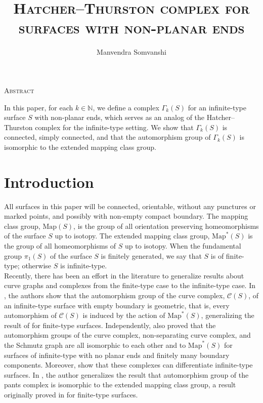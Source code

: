\documentclass[11pt]{article}
\title{\large\textsc{Hatcher--Thurston complex for surfaces with non-planar ends}}
\author{\normalsize Manvendra Somvanshi}
\date{}
\def\N{\mathbb{N}}
\def\map{\text{Map}}
\renewcommand{\abstractname}{\textmd{\textsc{Abstract}}}
\renewenvironment{abstract}
 {\small
  \begin{center}
  \abstractname\vspace{0pt}\vspace{0pt}
  \end{center}
  \quotation}
 {\endquotation}
\begin{document}
\maketitle
\begin{abstract}
In this paper, for each $k\in \N$, we define a complex $\Gamma_k(S)$ for an infinite-type surface $S$ with non-planar ends, which serves as an analog of the Hatcher--Thurston complex for the infinite-type setting. We show that $\Gamma_k(S)$ is connected, simply connected, and that the automorphism group of $\Gamma_k(S)$ is isomorphic to the extended mapping class group.
\end{abstract}
\section*{Introduction}\label{intro}
All surfaces in this paper will be connected, orientable, without any punctures or marked points, and possibly with non-empty compact boundary. The mapping class group, $\map(S)$, is the group of all orientation preserving homeomorphisms of the surface $S$ up to isotopy. The extended mapping class group, $\map^*(S)$ is the group of all homeomorphisms of $S$ up to isotopy. When the fundamental group $\pi_1(S)$ of the surface $S$ is finitely generated, we say that $S$ is of finite-type; otherwise $S$ is infinite-type.\\

Recently, there has been an effort in the literature to generalize results about curve graphs and complexes from the finite-type case to the infinite-type case. In \cite{bavard}, the authors show that the automorphism group of the curve complex, $ \mathcal{C}(S)$, of an infinite-type surface with empty boundary is geometric, that is, every automorphism of $ \mathcal{C}(S)$ is induced by the action of $\map^*(S)$, generalizing the result of \cites{ivanov, luo1999, korkmaz} for finite-type surfaces. Independently, \cite{hernandez} also proved that the automorphism groups of the curve complex, non-separating curve complex, and the Schmutz graph are all isomorphic to each other and to $\map^*(S)$ for surfaces of infinite-type with no planar ends and finitely many boundary components. Moreover, \cite{hernandez, bavard} show that these complexes can differentiate infinite-type surfaces. In \cite{branman}, the author generalizes the result that automorphism group of the pants complex is isomorphic to the extended mapping class group, a result originally proved in \cite{margalit04} for finite-type surfaces. \\
\end{document}
